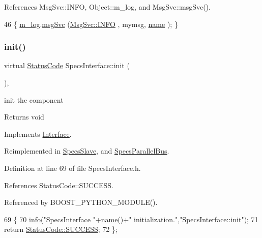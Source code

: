 References Msg\+Svc\+::\+I\+N\+FO, Object\+::m\+\_\+log, and Msg\+Svc\+::msg\+Svc().


\begin{DoxyCode}
46 \{ \hyperlink{classObject_a0d269813dd7ac1f24bc143031e2963f2}{m\_log}.\hyperlink{classMsgSvc_ad25f18047920cc59a314e5098259711c}{msgSvc} (\hyperlink{classMsgSvc_ae671eb7301996cd049d2da8a65925926ad2fcf3f3e734fc41ee097cc23670ce51}{MsgSvc::INFO}    , mymsg, \hyperlink{classObject_a300f4c05dd468c7bb8b3c968868443c1}{name} ); \}
\end{DoxyCode}
\mbox{\label{classSpecsInterface_a99ec05cbe0d15892afbec6feaf33c89b}} 
\subsubsection{\texorpdfstring{init()}{init()}}
{\footnotesize\ttfamily virtual \hyperlink{classStatusCode}{Status\+Code} Specs\+Interface\+::init (\begin{DoxyParamCaption}{ }\end{DoxyParamCaption})\hspace{0.3cm}{\ttfamily [inline]}, {\ttfamily [virtual]}}

init the component

\begin{DoxyReturn}{Returns}
void 
\end{DoxyReturn}


Implements \hyperlink{classInterface_a1d095c113b1e89d1f5f68323856fee63}{Interface}.



Reimplemented in \hyperlink{classSpecsSlave_ab34b5117373a334027d3a5cf33287bb6}{Specs\+Slave}, and \hyperlink{classSpecsParallelBus_a43d9435450ba71990004638e42eec1ae}{Specs\+Parallel\+Bus}.



Definition at line 69 of file Specs\+Interface.\+h.



References Status\+Code\+::\+S\+U\+C\+C\+E\+SS.



Referenced by B\+O\+O\+S\+T\+\_\+\+P\+Y\+T\+H\+O\+N\+\_\+\+M\+O\+D\+U\+L\+E().


\begin{DoxyCode}
69                             \{
70     \hyperlink{classObject_a644fd329ea4cb85f54fa6846484b84a8}{info}(\textcolor{stringliteral}{"SpecsInterface "}+\hyperlink{classObject_a300f4c05dd468c7bb8b3c968868443c1}{name}()+\textcolor{stringliteral}{" initialization."},\textcolor{stringliteral}{"SpecsInterface::init"});
71     \textcolor{keywordflow}{return} \hyperlink{classStatusCode_a6f565cbeadc76d14c72f047e5e85eb4badd0da38d3ba0d922efd1f4619bc37ad8}{StatusCode::SUCCESS};
72   \};
\end{DoxyCode}
\mbox{\label{classAttrib_a704f26af560909ad22065083bb7d4c34}} 
